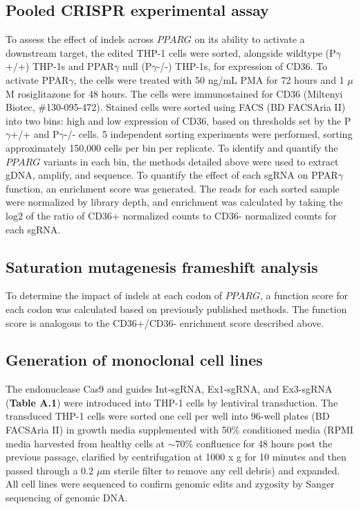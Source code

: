 \subsection{Pooled CRISPR experimental assay}
To assess the effect of indels across \(PPARG\) on its ability to activate a downstream target, the edited THP-1 cells were sorted, alongside wildtype (P$\gamma$+/+) THP-1s and PPAR$\gamma$ null (P$\gamma$-/-) THP-1s, for expression of CD36. To activate PPAR$\gamma$, the cells were treated with 50 ng/mL PMA for 72 hours and 1 $\mu$M rosiglitazone for 48 hours. The cells were immunostained for CD36 (Miltenyi Biotec, \#130-095-472). Stained cells were sorted using FACS (BD FACSAria II) into two bins: high and low expression of CD36, based on thresholds set by the P$\gamma$+/+ and P$\gamma$-/- cells. 5 independent sorting experiments were performed, sorting approximately 150,000 cells per bin per replicate. To identify and quantify the \(PPARG\) variants in each bin, the methods detailed above were used to extract gDNA, amplify, and sequence. To quantify the effect of each sgRNA on PPAR$\gamma$ function, an enrichment score was generated. The reads for each sorted sample were normalized by library depth, and enrichment was calculated by taking the log2 of the ratio of CD36+ normalized counts to CD36- normalized counts for each sgRNA. 

\subsection{Saturation mutagenesis frameshift analysis}
To determine the impact of indels at each codon of \(PPARG\), a function score for each codon was calculated based on previously published methods\cite{Majithia2016-bm}. The function score is analogous to the CD36+/CD36- enrichment score described above.

\subsection{Generation of monoclonal cell lines}
The endonuclease Cas9 and guides Int-sgRNA, Ex1-sgRNA, and Ex3-sgRNA (\textbf{Table A.1}) were introduced into THP-1 cells by lentiviral transduction. The transduced THP-1 cells were sorted one cell per well into 96-well plates (BD FACSAria II) in growth media supplemented with 50\% conditioned media (RPMI media harvested from healthy cells at $\sim$70\% confluence for 48 hours post the previous passage, clarified by centrifugation at 1000 x g for 10 minutes and then passed through a 0.2 $\mu$m sterile filter to remove any cell debris) and expanded. All cell lines were sequenced to confirm genomic edits and zygosity by Sanger sequencing of genomic DNA.

